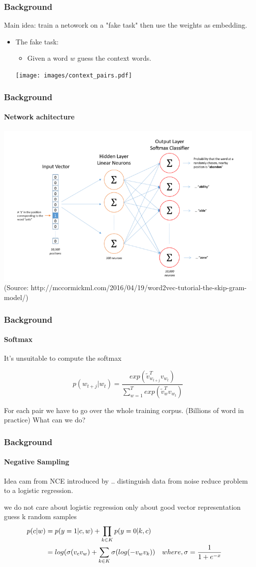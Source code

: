 \begin{frame}\frametitle{Background}
Main idea: train a netowork on a "fake task" then use the weights as embedding. \bigskip
\begin{itemize}
\item The fake task:
\begin{itemize}
\item Given a word $w$ guess the context words. 
\end{itemize}
\texttt{[image: images/context\_pairs.pdf]}
\end{itemize}
\end{frame}

\begin{frame}\frametitle{Background}\framesubtitle{Network achitecture}
\includegraphics[scale=0.37]{images/ntw_architecture.png}
(Source: http://mccormickml.com/2016/04/19/word2vec-tutorial-the-skip-gram-model/) 
\end{frame}

\begin{frame}\frametitle{Background}\framesubtitle{Softmax}
\begin{Large}
It's unsuitable to compute the softmax
\end{Large}
   \begin{equation}
   p(w_{t+j}|w_t)=  \frac{exp( \tilde{v}_{w_{t+j}}^Tv_{w_t})}{\sum_{w=1}^T exp(\tilde{v}_w^Tv_{ w_t})}
   \end{equation}
   
   For each pair we have to go over the whole training corpus. (Billions of word in practice) 
   What can we do? 
\end{frame}

\begin{frame}\frametitle{Background}\framesubtitle{Negative Sampling}
Idea cam from NCE introduced by .. 
distinguish data from noise reduce problem to a logistic regression. 

we do not care about logistic regression only about good vector representation
guess k random samples 
  \begin{align*}
p(c|w) &= p(y=1|c,w) + \prod_{k\in K} p(y=0|k,c) 
\\&= log(\sigma(v_c v_w ) + \sum_{k\in K} \sigma(log(-v_w v_k )) &&\text{$ where, \sigma = \frac{1}{1+e^{-x}}$}
\end{align*}
\end{frame}